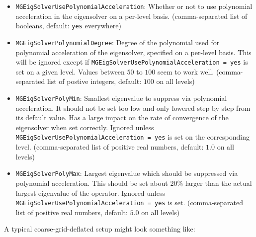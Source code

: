 \begin{itemize}
  \item{ \texttt{MGEigSolverUsePolynomialAcceleration}: Whether or not to use polynomial acceleration in the eigensolver on a per-level basis. (comma-separated list of booleans, default: \texttt{yes} everywhere)}
  \item{ \texttt{MGEigSolverPolynomialDegree}: Degree of the polynomial used for polynomial acceleration of the eigensolver, specified on a per-level basis. This will be ignored except if \texttt{MGEigSolverUsePolynomialAcceleration = yes} is set on a given level. Values between $50$ to $100$ seem to work well. (comma-separated list of postive integers, default: $100$ on all levels)}
  \item{ \texttt{MGEigSolverPolyMin}: Smallest eigenvalue to suppress via polynomial acceleration. It should not be set too low and only lowered step by step from its default value. Has a large impact on the rate of convergence of the eigensolver when set correctly. Ignored unless \texttt{MGEigSolverUsePolynomialAcceleration = yes} is set on the corresponding level. (comma-separated list of positive real numbers, default: $1.0$ on all levels)}
  \item{ \texttt{MGEigSolverPolyMax}: Largest eigenvalue which should be suppressed via polynomial acceleration. This should be set about 20\% larger than the actual largest eigenvalue of the operator. Ignored unless \texttt{MGEigSolverUsePolynomialAcceleration = yes} is set. (comma-separated list of positive real numbers, default: $5.0$ on all levels)}
\end{itemize}

A typical coarse-grid-deflated setup might look something like:

